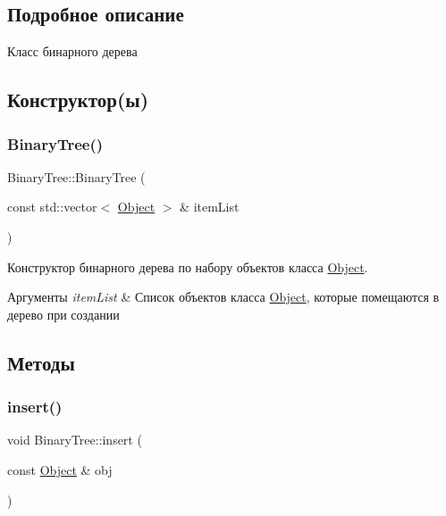 \subsection{Подробное описание}
Класс бинарного дерева 

\subsection{Конструктор(ы)}
\mbox{\label{classBinaryTree_a40a2af97186493b6bad3ee90e9a9c425}} 
\subsubsection{\texorpdfstring{Binary\+Tree()}{BinaryTree()}}
{\footnotesize\ttfamily Binary\+Tree\+::\+Binary\+Tree (\begin{DoxyParamCaption}\item[{const std\+::vector$<$ \mbox{\hyperlink{structObject}{Object}} $>$ \&}]{item\+List }\end{DoxyParamCaption})}



Конструктор бинарного дерева по набору объектов класса \mbox{\hyperlink{structObject}{Object}}. 


\begin{DoxyParams}{Аргументы}
{\em item\+List} & Список объектов класса \mbox{\hyperlink{structObject}{Object}}, которые помещаются в дерево при создании \\
\hline
\end{DoxyParams}


\subsection{Методы}
\mbox{\label{classBinaryTree_af3d8f80f5451cbacb0338fa533d135ac}} 
\subsubsection{\texorpdfstring{insert()}{insert()}}
{\footnotesize\ttfamily void Binary\+Tree\+::insert (\begin{DoxyParamCaption}\item[{const \mbox{\hyperlink{structObject}{Object}} \&}]{obj }\end{DoxyParamCaption})}



